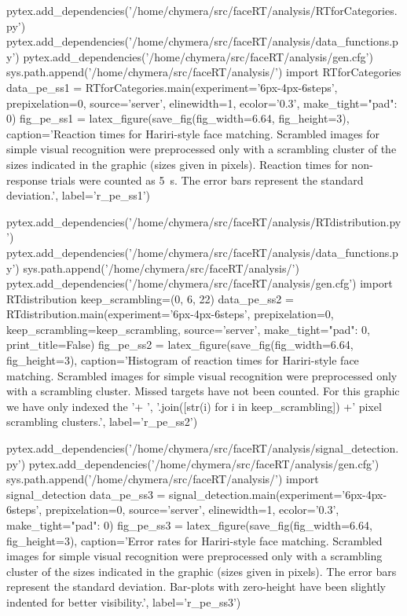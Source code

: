 \begin{pycode}[pe_ss1]
pytex.add_dependencies('/home/chymera/src/faceRT/analysis/RTforCategories.py')
pytex.add_dependencies('/home/chymera/src/faceRT/analysis/data_functions.py')
pytex.add_dependencies('/home/chymera/src/faceRT/analysis/gen.cfg')
sys.path.append('/home/chymera/src/faceRT/analysis/')
import RTforCategories
data_pe_ss1 = RTforCategories.main(experiment='6px-4px-6steps', prepixelation=0, source='server', elinewidth=1, ecolor='0.3', make_tight={"pad": 0})
fig_pe_ss1 = latex_figure(save_fig(fig_width=6.64, fig_height=3), caption='Reaction times for Hariri-style face matching. Scrambled images for simple visual recognition were preprocessed only with a scrambling cluster of the sizes indicated in the graphic (sizes given in pixels). Reaction times for non-response trials were counted as \SI{5}{\second}. The error bars represent the standard deviation.', label='r_pe_ss1')
\end{pycode}
\begin{pycode}
pytex.add_dependencies('/home/chymera/src/faceRT/analysis/RTdistribution.py')
pytex.add_dependencies('/home/chymera/src/faceRT/analysis/data_functions.py')
sys.path.append('/home/chymera/src/faceRT/analysis/')
pytex.add_dependencies('/home/chymera/src/faceRT/analysis/gen.cfg')
import RTdistribution
keep_scrambling=(0, 6, 22)
data_pe_ss2 = RTdistribution.main(experiment='6px-4px-6steps', prepixelation=0, keep_scrambling=keep_scrambling, source='server', make_tight={"pad": 0}, print_title=False)
fig_pe_ss2 = latex_figure(save_fig(fig_width=6.64, fig_height=3), caption='Histogram of reaction times for Hariri-style face matching. Scrambled images for simple visual recognition were preprocessed only with a scrambling cluster. Missed targets have not been counted. For this graphic we have only indexed the '+ ', '.join([str(i) for i in keep_scrambling]) +' pixel scrambling clusters.', label='r_pe_ss2')
\end{pycode}
\begin{pycode}[pe_ss3]
pytex.add_dependencies('/home/chymera/src/faceRT/analysis/signal_detection.py')
pytex.add_dependencies('/home/chymera/src/faceRT/analysis/gen.cfg')
sys.path.append('/home/chymera/src/faceRT/analysis/')
import signal_detection
data_pe_ss3 = signal_detection.main(experiment='6px-4px-6steps', prepixelation=0, source='server', elinewidth=1, ecolor='0.3', make_tight={"pad": 0})
fig_pe_ss3 = latex_figure(save_fig(fig_width=6.64, fig_height=3), caption='Error rates for Hariri-style face matching. Scrambled images for simple visual recognition were preprocessed only with a scrambling cluster of the sizes indicated in the graphic (sizes given in pixels). The error bars represent the standard deviation. Bar-plots with zero-height have been slightly indented for better visibility.', label='r_pe_ss3')
\end{pycode}
